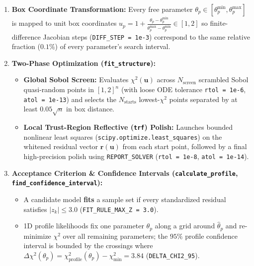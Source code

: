 \documentclass[11pt,a4paper]{article}
\begin{document}
\begin{enumerate}[leftmargin=1.8em]
    \item \textbf{Box Coordinate Transformation:}
    Every free parameter $\theta_p \in [\theta_p^{\min}, \theta_p^{\max}]$ is mapped to unit box coordinates $u_p = 1 + \frac{\theta_p - \theta_p^{\min}}{\theta_p^{\max} - \theta_p^{\min}} \in [1, 2]$ so finite-difference Jacobian steps (\texttt{DIFF\_\allowbreak{}STEP = 1e-3}) correspond to the same relative fraction ($0.1\%$) of every parameter's search interval.

    \item \textbf{Two-Phase Optimization (\texttt{fit\_\allowbreak{}structure}):}
    \begin{itemize}[leftmargin=1.5em]
        \item \textbf{Global Sobol Screen:} Evaluates $\chi^2(\mathbf{u})$ across $N_{\text{screen}}$ scrambled Sobol quasi-random points in $[1, 2]^n$ (with loose ODE tolerance \texttt{rtol = 1e-6}, \texttt{atol = 1e-13}) and selects the $N_{\text{starts}}$ lowest-$\chi^2$ points separated by at least $0.05\sqrt{n}$ in box distance.
        \item \textbf{Local Trust-Region Reflective (\texttt{trf}) Polish:} Launches bounded nonlinear least squares (\texttt{scipy.optimize.least\_\allowbreak{}squares}) on the whitened residual vector $\mathbf{r}(\mathbf{u})$ from each start point, followed by a final high-precision polish using \texttt{REPORT\_\allowbreak{}SOLVER} (\texttt{rtol = 1e-8}, \texttt{atol = 1e-14}).
    \end{itemize}

    \item \textbf{Acceptance Criterion \& Confidence Intervals (\texttt{calculate\_\allowbreak{}profile}, \texttt{find\_\allowbreak{}confidence\_\allowbreak{}interval}):}
    \begin{itemize}[leftmargin=1.5em]
        \item A candidate model \textbf{fits} a sample set if every standardized residual satisfies $|z_k| \le 3.0$ (\texttt{FIT\_\allowbreak{}RULE\_\allowbreak{}MAX\_\allowbreak{}Z = 3.0}).
        \item 1D profile likelihoods fix one parameter $\theta_p$ along a grid around $\hat{\theta}_p$ and re-minimize $\chi^2$ over all remaining parameters; the $95\%$ profile confidence interval is bounded by the crossings where $\Delta \chi^2(\theta_p) = \chi^2_{\text{profile}}(\theta_p) - \chi^2_{\min} = 3.84$ (\texttt{DELTA\_\allowbreak{}CHI2\_\allowbreak{}95}).
    \end{itemize}
\end{enumerate}
\end{document}
